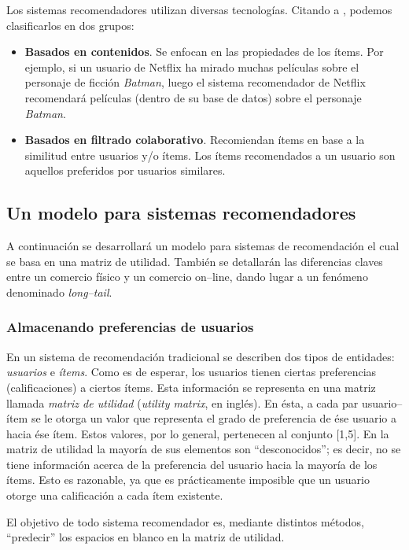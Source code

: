 		Los sistemas recomendadores utilizan diversas tecnologías. Citando a \cite{ullman2014}, podemos clasificarlos en dos grupos:
		\begin{itemize}
			\item \textbf{Basados en contenidos}. Se enfocan en las propiedades de los ítems. Por ejemplo, si un usuario de Netflix ha mirado muchas películas sobre el personaje de ficción \textit{Batman}, luego el sistema recomendador de Netflix recomendará películas (dentro de su base de datos) sobre el personaje \textit{Batman}.
			\item \textbf{Basados en filtrado colaborativo}. Recomiendan ítems en base a la similitud entre usuarios y/o ítems. Los ítems recomendados a un usuario son aquellos preferidos por usuarios similares.
		\end{itemize}
	
	\subsection{Un modelo para sistemas recomendadores}
		A continuación se desarrollará un modelo para sistemas de recomendación el cual se basa en una matriz de utilidad. También se detallarán las diferencias claves entre un comercio físico y un comercio on--line, dando lugar a un fenómeno denominado \textit{long--tail}.
		
		\subsubsection{Almacenando preferencias de usuarios}
			En un sistema de recomendación tradicional se describen dos tipos de entidades: \textit{usuarios} e \textit{ítems}. Como es de esperar, los usuarios tienen ciertas preferencias (calificaciones) a ciertos ítems. Esta información se representa en una matriz llamada \textit{matriz de utilidad} (\textit{utility matrix}, en inglés). En ésta, a cada par usuario--ítem se le otorga un valor que representa el grado de preferencia de ése usuario a hacia ése ítem. Estos valores, por lo general, pertenecen al conjunto [1,5]. En la matriz de utilidad la mayoría de sus elementos son \enquote{desconocidos}; es decir, no se tiene información acerca de la preferencia del usuario hacia la mayoría de los ítems. Esto es razonable, ya que es prácticamente imposible que un usuario otorge una calificación a cada ítem existente. \par
			El objetivo de todo sistema recomendador es, mediante distintos métodos, \enquote{predecir} los espacios en blanco en la matriz de utilidad. \par
			
